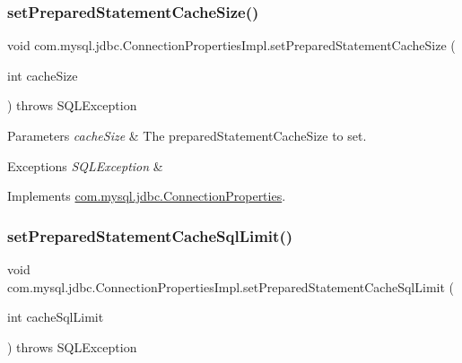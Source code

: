 \subsubsection{\texorpdfstring{set\+Prepared\+Statement\+Cache\+Size()}{setPreparedStatementCacheSize()}}
{\footnotesize\ttfamily void com.\+mysql.\+jdbc.\+Connection\+Properties\+Impl.\+set\+Prepared\+Statement\+Cache\+Size (\begin{DoxyParamCaption}\item[{int}]{cache\+Size }\end{DoxyParamCaption}) throws S\+Q\+L\+Exception}


\begin{DoxyParams}{Parameters}
{\em cache\+Size} & The prepared\+Statement\+Cache\+Size to set. \\
\hline
\end{DoxyParams}

\begin{DoxyExceptions}{Exceptions}
{\em S\+Q\+L\+Exception} & \\
\hline
\end{DoxyExceptions}


Implements \mbox{\hyperlink{interfacecom_1_1mysql_1_1jdbc_1_1_connection_properties_ad65dad2e98f66f1b4a8d1aff24cbc2d5}{com.\+mysql.\+jdbc.\+Connection\+Properties}}.

\mbox{\label{classcom_1_1mysql_1_1jdbc_1_1_connection_properties_impl_ab0d1a7e28fc1bcf16c1ee658e6a6ef7a}} 
\subsubsection{\texorpdfstring{set\+Prepared\+Statement\+Cache\+Sql\+Limit()}{setPreparedStatementCacheSqlLimit()}}
{\footnotesize\ttfamily void com.\+mysql.\+jdbc.\+Connection\+Properties\+Impl.\+set\+Prepared\+Statement\+Cache\+Sql\+Limit (\begin{DoxyParamCaption}\item[{int}]{cache\+Sql\+Limit }\end{DoxyParamCaption}) throws S\+Q\+L\+Exception}


